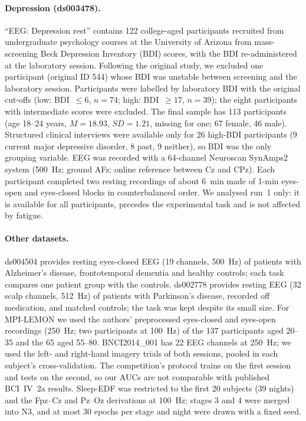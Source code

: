 \documentclass[11pt]{article}
\begin{document}
\paragraph{Depression (ds003478).} ``EEG: Depression rest'' \citep[OpenNeuro ds003478 v1.1.0,
CC0;][]{cavanagh_ds003478, cavanagh2019} contains 122 college-aged participants recruited
from undergraduate psychology courses at the University of Arizona from mass-screening Beck
Depression Inventory (BDI) scores, with the BDI re-administered at the laboratory session.
Following the original study, we excluded one participant (original ID 544) whose BDI was
unstable between screening and the laboratory session. Participants were labelled by laboratory
BDI with the original cut-offs (low: BDI~$\le 6$, $n = 74$; high: BDI~$\ge 17$, $n = 39$); the
eight participants with intermediate scores were excluded. The final sample has 113 participants
(age 18--24 years, $M = 18.93$, $SD = 1.21$, missing for one; 67 female, 46 male). Structured
clinical interviews were available only for 26 high-BDI participants (9 current major depressive
disorder, 8 past, 9 neither), so BDI was the only grouping variable. EEG was recorded with a
64-channel Neuroscan SynAmps2 system (500~Hz; ground AFz; online reference between Cz and CPz).
Each participant completed two resting recordings of about 6~min made of 1-min eyes-open and
eyes-closed blocks in counterbalanced order. We analysed run~1 only: it is available for all
participants, precedes the experimental task and is not affected by fatigue.

\paragraph{Other datasets.} ds004504 \citep{miltiadous2023} provides resting eyes-closed EEG
(19 channels, 500~Hz) of patients with Alzheimer's disease, frontotemporal dementia and healthy
controls; each task compares one patient group with the controls. ds002778
\citep{rockhill_ds002778, jackson2019, swann2015, george2013} provides resting EEG (32 scalp
channels, 512~Hz) of patients with Parkinson's disease, recorded off medication, and matched
controls; the task was kept despite its small size. For MPI-LEMON \citep{babayan2019} we used
the authors' preprocessed eyes-closed and eyes-open recordings (250~Hz; two participants at
100~Hz) of the 137 participants aged 20--35 and the 65 aged 55--80. BNCI2014\_001
\citep[BCI Competition IV 2a;][]{tangermann2012, jayaram2018} has 22 EEG channels at 250~Hz;
we used the left- and right-hand imagery trials of both sessions, pooled in each subject's
cross-validation. The competition's protocol trains on the first session and tests on the second,
so our AUCs are not comparable with published BCI~IV~2a results. Sleep-EDF
\citep[sleep cassette;][]{kemp2000, goldberger2000} was restricted to the first 20 subjects
(39 nights) and the Fpz--Cz and Pz--Oz derivations at 100~Hz; stages 3 and 4 were merged into N3,
and at most 30 epochs per stage and night were drawn with a fixed seed.
\end{document}
